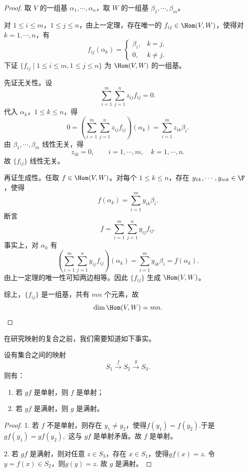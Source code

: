 \begin{proof}
	取 $V$ 的一组基 $\alpha_1,\cdots,\alpha_n$，取 $W$ 的一组基
	$\beta_1,\cdots,\beta_m$。
	
	对 $1\leq i\leq m$，$1\leq j\leq n$，由上一定理，存在唯一的
	$f_{ij}\in\Hom(V,W)$，使得对 $k=1,\cdots,n$，有
	\[
	f_{ij}(\alpha_k)=
	\begin{cases}
		\beta_i, & k=j,\\
		0, & k\neq j.
	\end{cases}
	\]
	下证 $\{f_{ij}\mid 1\leq i\leq m,
	1\leq j\leq n\}$ 为 $\Hom(V,W)$ 的一组基。
	
	先证无关性。设
	\[
	\sum_{i=1}^{m}\sum_{j=1}^{n}z_{ij}f_{ij}=0.
	\]
	代入 $\alpha_k$，$1\leq k\leq n$，得
	\[
	0=
	\left(\sum_{i=1}^{m}\sum_{j=1}^{n}z_{ij}f_{ij}\right)(\alpha_k)
	=\sum_{i=1}^{m}z_{ik}\beta_i.
	\]
	由 $\beta_1,\cdots,\beta_m$ 线性无关，得
	\[
	z_{ik}=0,
	\qquad i=1,\cdots,m,
	\quad k=1,\cdots,n.
	\]
	故 $\{f_{ij}\}$ 线性无关。
	
	再证生成性。任取 $f\in\Hom(V,W)$。对每个
	$1\leq k\leq n$，存在 $y_{1k},\cdots,y_{mk}\in\F$，使得
	\[
	f(\alpha_k)=\sum_{i=1}^{m}y_{ik}\beta_i.
	\]
	断言
	\[
	f=\sum_{i=1}^{m}\sum_{j=1}^{n}y_{ij}f_{ij}.
	\]
	事实上，对 $\alpha_k$ 有
	\[
	\left(\sum_{i=1}^{m}\sum_{j=1}^{n}y_{ij}f_{ij}\right)(\alpha_k)
	=
	\sum_{i=1}^{m}y_{ik}\beta_i
	=f(\alpha_k).
	\]
	由上一定理的唯一性可知两边相等。因此 $\{f_{ij}\}$ 生成
	$\Hom(V,W)$。
	
	综上，$\{f_{ij}\}$ 是一组基，共有 $mn$ 个元素，故
	\[
	\dim\Hom(V,W)=mn.
	\]
\end{proof}

在研究映射的复合之前，我们需要知道如下事实。

\begin{proposition}\label{4.6.4}
	设有集合之间的映射
	\[
	S_1\xrightarrow{\ f\ }S_2\xrightarrow{\ g\ }S_3.
	\]
	则有：
	\begin{enumerate}
		\item 若 $gf$ 是单射，则 $f$ 是单射；
		\item 若 $gf$ 是满射，则 $g$ 是满射。
	\end{enumerate}
\end{proposition}

\begin{proof}
	1. 若 $f$ 不是单射，则存在 $y_1\neq y_2$，使得$f(y_1)=f(y_2). $于是$gf(y_1)=gf(y_2), $
	这与 $gf$ 是单射矛盾。故 $f$ 是单射。
	
	2. 若 $gf$ 是满射，则对任意 $z\in S_3$，存在 $x\in S_1$，使得$gf(x)=z.$
	令 $y=f(x)\in S_2$，则$g(y)=z.$
	故 $g$ 是满射。
\end{proof}

